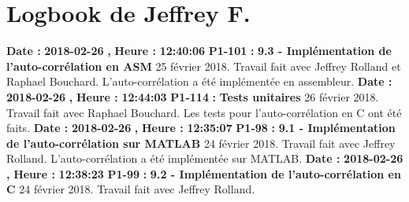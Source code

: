 \documentclass{article}%
\begin{document}
%
\section{Logbook de Jeffrey F.}%
\textbf{Date : }%
\textbf{2018{-}02{-}26}%
\textbf{,}%
\textbf{ Heure : }%
\textbf{12:40:06}%
\newline%
%
\textbf{P1{-}101 }%
\textbf{ : }%
\textbf{ 9.3 {-} Implémentation de l'auto{-}corrélation en ASM}%
\newline%
\newline%
%
25 février 2018.\newline%
Travail fait avec Jeffrey Rolland et Raphael Bouchard.\newline%
L'auto{-}corrélation a été implémentée en assembleur.\newline%
\newline%
%
\textbf{Date : }%
\textbf{2018{-}02{-}26}%
\textbf{,}%
\textbf{ Heure : }%
\textbf{12:44:03}%
\newline%
%
\textbf{P1{-}114 }%
\textbf{ : }%
\textbf{ Tests unitaires}%
\newline%
\newline%
%
26 février 2018.\newline%
Travail fait avec Raphael Bouchard.\newline%
Les tests pour l'auto{-}corrélation en C ont été faits.\newline%
\newline%
%
\textbf{Date : }%
\textbf{2018{-}02{-}26}%
\textbf{,}%
\textbf{ Heure : }%
\textbf{12:35:07}%
\newline%
%
\textbf{P1{-}98 }%
\textbf{ : }%
\textbf{ 9.1 {-} Implémentation de l'auto{-}corrélation sur MATLAB}%
\newline%
\newline%
%
24 février 2018.\newline%
Travail fait avec Jeffrey Rolland.\newline%
L'auto{-}corrélation a été implémentée sur MATLAB.\newline%
\newline%
%
\textbf{Date : }%
\textbf{2018{-}02{-}26}%
\textbf{,}%
\textbf{ Heure : }%
\textbf{12:38:23}%
\newline%
%
\textbf{P1{-}99 }%
\textbf{ : }%
\textbf{ 9.2 {-} Implémentation de l'auto{-}corrélation en C}%
\newline%
\newline%
%
24 février 2018.\newline%
Travail fait avec Jeffrey Rolland.\newline%
\end{document}

